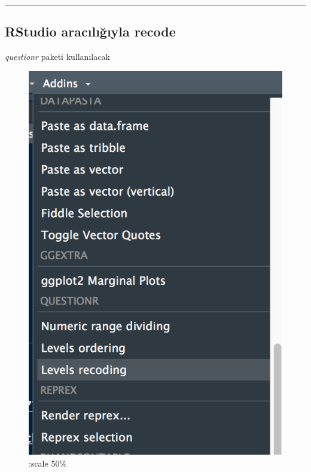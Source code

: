 \documentclass[]{article}
\begin{document}
\begin{center}\rule{0.5\linewidth}{\linethickness}\end{center}

\hypertarget{rstudio-araciligiyla-recode}{%
\subsection{RStudio aracılığıyla
recode}\label{rstudio-araciligiyla-recode}}

\emph{questionr} paketi kullanılacak

\begin{figure}
\centering
\includegraphics{figures/level_recode.png}
\caption{:scale 50\%}
\end{figure}
\end{document}
